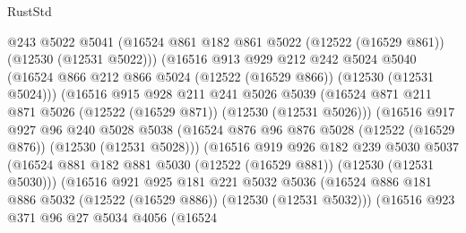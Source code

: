 \begin{lexlean}{RustStd}
\begin{coremodule}
                    @243
                    @5022
                    @5041
                    (@16524 @861 @182 @861 @5022 (@12522 (@16529 @861)) (@12530 (@12531 @5022)))
                    (@16516
                      @913
                      @929
                      @212
                      @242
                      @5024
                      @5040
                      (@16524 @866 @212 @866 @5024 (@12522 (@16529 @866)) (@12530 (@12531 @5024)))
                      (@16516
                        @915
                        @928
                        @211
                        @241
                        @5026
                        @5039
                        (@16524 @871 @211 @871 @5026 (@12522 (@16529 @871)) (@12530 (@12531 @5026)))
                        (@16516
                          @917
                          @927
                          @96
                          @240
                          @5028
                          @5038
                          (@16524
                            @876
                            @96
                            @876
                            @5028
                            (@12522 (@16529 @876))
                            (@12530 (@12531 @5028)))
                          (@16516
                            @919
                            @926
                            @182
                            @239
                            @5030
                            @5037
                            (@16524
                              @881
                              @182
                              @881
                              @5030
                              (@12522 (@16529 @881))
                              (@12530 (@12531 @5030)))
                            (@16516
                              @921
                              @925
                              @181
                              @221
                              @5032
                              @5036
                              (@16524
                                @886
                                @181
                                @886
                                @5032
                                (@12522 (@16529 @886))
                                (@12530 (@12531 @5032)))
                              (@16516
                                @923
                                @371
                                @96
                                @27
                                @5034
                                @4056
                                (@16524

\end{coremodule}
\end{lexlean}
